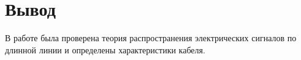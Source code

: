 \section{Вывод}
В работе была проверена теория распространения электрических сигналов по длинной линии и определены
характеристики кабеля. 
